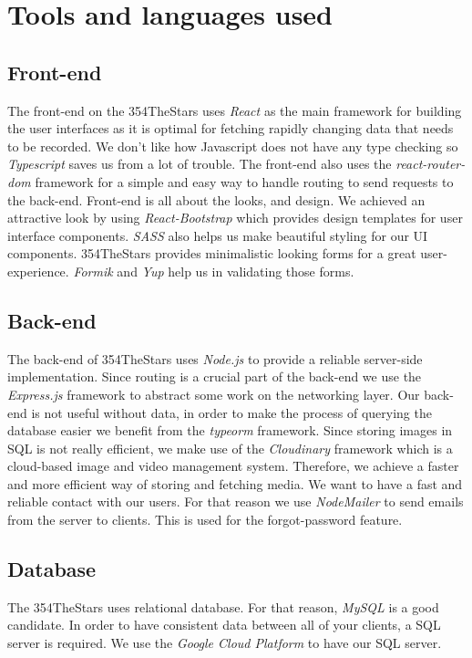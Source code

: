 \documentclass[11pt]{article}
\newcounter{use case ID}
\newcounter{req ID}
\begin{document}
\section{Tools and languages used}
    \subsection{Front-end}
        The front-end on the 354TheStars uses \textit{React} as the main framework for building the user interfaces as it is optimal for fetching rapidly changing data that needs to be recorded. We don't like how Javascript does not have any type checking so \textit{Typescript} saves us from a lot of trouble.
        The front-end also uses the \textit{react-router-dom} framework for a simple and easy way to handle routing to send requests to the back-end. 
        Front-end is all about the looks, and design. We achieved an attractive look by using  \textit{React-Bootstrap}  which provides design templates for user interface components. \textit{SASS} also helps us make beautiful styling for our UI components. 
        354TheStars provides minimalistic looking forms for a great user-experience. \textit{Formik} and \textit{Yup} help us in validating those forms.
    \subsection{Back-end}
        The back-end of 354TheStars uses \textit{Node.js} to provide a reliable server-side implementation. Since routing is a crucial part of the back-end we use the \textit{Express.js} framework to abstract some work on the networking layer. 
        Our back-end is not useful without data, in order to make the process of querying the database easier we benefit from the \textit{typeorm} framework.
        Since storing images in SQL is not really efficient, we make use of the \textit{Cloudinary} framework which is a cloud-based image and video management system. Therefore, we achieve a faster and more efficient way of storing and fetching media.
        We want to have a fast and reliable contact with our users. For that reason we use \textit{NodeMailer} to send emails from the server to clients. This is used for the forgot-password feature.
    \subsection{Database}
        The 354TheStars uses relational database. For that reason, \textit{MySQL} is a good candidate. In order to have consistent data between all of your clients, a SQL server is required. We use the \textit{Google Cloud Platform} to have our SQL server.
\end{document}
